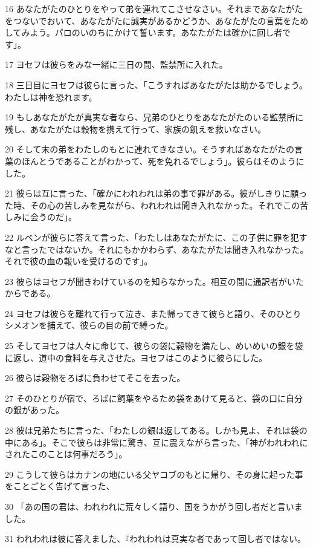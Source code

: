 \par 16 あなたがたのひとりをやって弟を連れてこさせなさい。それまであなたがたをつないでおいて、あなたがたに誠実があるかどうか、あなたがたの言葉をためしてみよう。パロのいのちにかけて誓います。あなたがたは確かに回し者です」。
\par 17 ヨセフは彼らをみな一緒に三日の間、監禁所に入れた。
\par 18 三日目にヨセフは彼らに言った、「こうすればあなたがたは助かるでしょう。わたしは神を恐れます。
\par 19 もしあなたがたが真実な者なら、兄弟のひとりをあなたがたのいる監禁所に残し、あなたがたは穀物を携えて行って、家族の飢えを救いなさい。
\par 20 そして末の弟をわたしのもとに連れてきなさい。そうすればあなたがたの言葉のほんとうであることがわかって、死を免れるでしょう」。彼らはそのようにした。
\par 21 彼らは互に言った、「確かにわれわれは弟の事で罪がある。彼がしきりに願った時、その心の苦しみを見ながら、われわれは聞き入れなかった。それでこの苦しみに会うのだ」。
\par 22 ルベンが彼らに答えて言った、「わたしはあなたがたに、この子供に罪を犯すなと言ったではないか。それにもかかわらず、あなたがたは聞き入れなかった。それで彼の血の報いを受けるのです」。
\par 23 彼らはヨセフが聞きわけているのを知らなかった。相互の間に通訳者がいたからである。
\par 24 ヨセフは彼らを離れて行って泣き、また帰ってきて彼らと語り、そのひとりシメオンを捕えて、彼らの目の前で縛った。
\par 25 そしてヨセフは人々に命じて、彼らの袋に穀物を満たし、めいめいの銀を袋に返し、道中の食料を与えさせた。ヨセフはこのように彼らにした。
\par 26 彼らは穀物をろばに負わせてそこを去った。
\par 27 そのひとりが宿で、ろばに飼葉をやるため袋をあけて見ると、袋の口に自分の銀があった。
\par 28 彼は兄弟たちに言った、「わたしの銀は返してある。しかも見よ、それは袋の中にある」。そこで彼らは非常に驚き、互に震えながら言った、「神がわれわれにされたこのことは何事だろう」。
\par 29 こうして彼らはカナンの地にいる父ヤコブのもとに帰り、その身に起った事をことごとく告げて言った、
\par 30 「あの国の君は、われわれに荒々しく語り、国をうかがう回し者だと言いました。
\par 31 われわれは彼に答えました、『われわれは真実な者であって回し者ではない。
